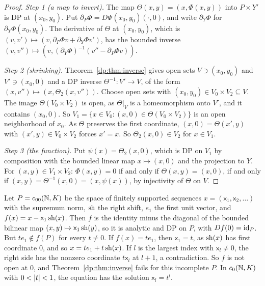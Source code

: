 \begin{proof}
\emph{Step 1 (a map to invert).} The map $\Theta(x,y)=(x,\Phi(x,y))$ into $P\times Y'$ is DP at $(x_0,y_0)$. Put $\partial_P\Phi=D\Phi(x_0,y_0)(\cdot,0)$, and write $\partial_Y\Phi$ for $\partial_Y\Phi(x_0,y_0)$. The derivative of $\Theta$ at $(x_0,y_0)$, which is $(v,v')\mapsto(v,\partial_P\Phi v+\partial_Y\Phi v')$, has the bounded inverse $(v,v'')\mapsto(v,(\partial_Y\Phi)^{-1}(v''-\partial_P\Phi v))$.

\emph{Step 2 (shrinking).} Theorem~\ref{dp:thm:inverse} gives open sets $V\ni(x_0,y_0)$ and $V'\ni(x_0,0)$ and a DP inverse $\Theta^{-1}\colon V'\to V$, of the form $(x,v'')\mapsto(x,\Theta_2(x,v''))$. Choose open sets with $(x_0,y_0)\in V_0\times V_2\subseteq V$. The image $\Theta(V_0\times V_2)$ is open, as $\Theta|_V$ is a homeomorphism onto $V'$, and it contains $(x_0,0)$. So $V_1=\{x\in V_0:(x,0)\in\Theta(V_0\times V_2)\}$ is an open neighborhood of $x_0$. As $\Theta$ preserves the first coordinate, $(x,0)=\Theta(x',y)$ with $(x',y)\in V_0\times V_2$ forces $x'=x$. So $\Theta_2(x,0)\in V_2$ for $x\in V_1$.

\emph{Step 3 (the function).} Put $\psi(x)=\Theta_2(x,0)$, which is DP on $V_1$ by composition with the bounded linear map $x\mapsto(x,0)$ and the projection to $Y$. For $(x,y)\in V_1\times V_2$: $\Phi(x,y)=0$ if and only if $\Theta(x,y)=(x,0)$, if and only if $(x,y)=\Theta^{-1}(x,0)=(x,\psi(x))$, by injectivity of $\Theta$ on $V$.
\end{proof}

\begin{remark}\label{dp:rem:completeness}
Let $P=c_{00}(\mathbb N,K)$ be the space of finitely supported sequences $x=(\mathsf x_1,\mathsf x_2,\dots)$ with the supremum norm, $\operatorname{sh}$ the right shift, $e_1$ the first unit vector, and $f(x)=x-\mathsf x_1\operatorname{sh}(x)$. Then $f$ is the identity minus the diagonal of the bounded bilinear map $(x,y)\mapsto\mathsf x_1\operatorname{sh}(y)$, so it is analytic and DP on $P$, with $Df(0)=\mathrm{id}_P$. But $te_1\notin f(P)$ for every $t\ne0$. If $f(x)=te_1$, then $\mathsf x_1=t$, as $\operatorname{sh}(x)$ has first coordinate $0$, and so $x=te_1+t\operatorname{sh}(x)$. If $l$ is the largest index with $\mathsf x_l\ne0$, the right side has the nonzero coordinate $t\mathsf x_l$ at $l+1$, a contradiction. So $f$ is not open at $0$, and Theorem~\ref{dp:thm:inverse} fails for this incomplete $P$. In $c_0(\mathbb N,K)$ with $0<\lvert t\rvert<1$, the equation has the solution $\mathsf x_l=t^l$.
\end{remark}

